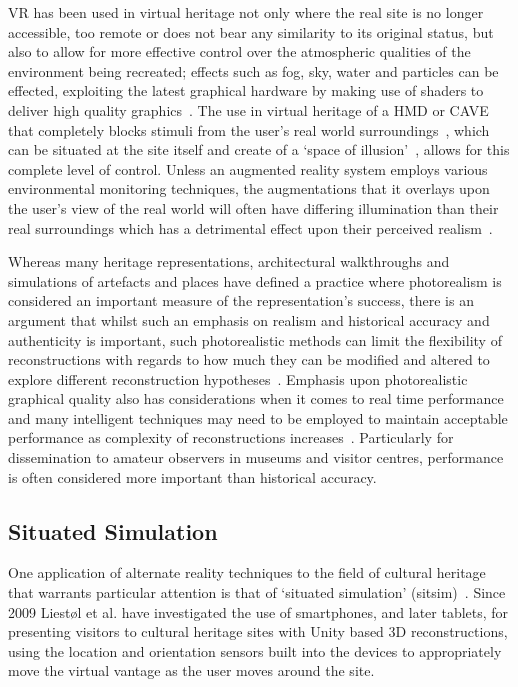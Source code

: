 VR has been used in virtual heritage not only where the real site is no longer accessible, too remote or does not bear any similarity to its original status, but also to allow for more effective control over the atmospheric qualities of the environment being recreated; effects such as fog, sky, water and particles can be effected, exploiting the latest graphical hardware by making use of shaders to deliver high quality graphics~\cite{deamicis:gamebased}. The use in virtual heritage of a HMD or CAVE that completely blocks stimuli from the user's real world surroundings~\cite{cabral:x3dexperience,Christou2006}, which can be situated at the site itself and create of a `space of illusion'~\cite{Tzortzaki2002}, allows for this complete level of control. Unless an augmented reality system employs various environmental monitoring techniques, the augmentations that it overlays upon the user's view of the real world will often have differing illumination than their real surroundings which has a detrimental effect upon their perceived realism~\cite{mcnamara:lightness}.

Whereas many heritage representations, architectural walkthroughs and simulations of artefacts and places have defined a practice where photorealism is considered an important measure of the representation's success, there is an argument that whilst such an emphasis on realism and historical accuracy and authenticity is important, such photorealistic methods can limit the flexibility of reconstructions with regards to how much they can be modified and altered to explore different reconstruction hypotheses~\cite{roussou:photorealism}. Emphasis upon photorealistic graphical quality also has considerations when it comes to real time performance and many intelligent techniques may need to be employed to maintain acceptable performance as complexity of reconstructions increases~\cite{willmott:largecomplex}. Particularly for dissemination to amateur observers in museums and visitor centres, performance is often considered more important than historical accuracy.


\subsection{Situated Simulation}
\label{situated-simulation}
One application of alternate reality techniques to the field of cultural heritage that warrants particular attention is that of `situated simulation' (sitsim)~\cite{Liestøl2009}. Since 2009 Liest\o l et al. have investigated the use of smartphones, and later tablets, for presenting visitors to cultural heritage sites with Unity based 3D reconstructions, using the location and orientation sensors built into the devices to appropriately move the virtual vantage as the user moves around the site.

